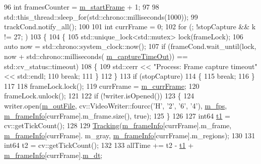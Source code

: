 \begin{DoxyCode}
96     \textcolor{keywordtype}{int} framesCounter = \mbox{\hyperlink{class_video_example_a98dbe94b8827c5a1898e3a9423cce402}{m\_startFrame}} + 1;
97 
98     std::this\_thread::sleep\_for(std::chrono::milliseconds(1000));
99     trackCond.notify\_all();
100 
101     \textcolor{keywordtype}{int} currFrame = 0;
102     \textcolor{keywordflow}{for} (; !stopCapture && k != 27; )
103     \{
104         \{
105             std::unique\_lock<std::mutex> lock(frameLock);
106             \textcolor{keyword}{auto} now = std::chrono::system\_clock::now();
107             \textcolor{keywordflow}{if} (frameCond.wait\_until(lock, now + std::chrono::milliseconds(
      \mbox{\hyperlink{class_video_example_aea3c9dd66a3464fab8c61a838aff0ccf}{m\_captureTimeOut}})) == std::cv\_status::timeout)
108             \{
109                 std::cerr << \textcolor{stringliteral}{"Process: Frame capture timeout"} << std::endl;
110                 \textcolor{keywordflow}{break};
111             \}
112         \}
113         \textcolor{keywordflow}{if} (stopCapture)
114         \{
115             \textcolor{keywordflow}{break};
116         \}
117 
118         frameLock.lock();
119         currFrame = \mbox{\hyperlink{class_video_example_a4adccbe4084f68f10d966901b168a98a}{m\_currFrame}};
120         frameLock.unlock();
121 
122         \textcolor{keywordflow}{if} (!writer.isOpened())
123         \{
124             writer.open(\mbox{\hyperlink{class_video_example_a4234fb0df2f009bc3f651f01cbd5bde5}{m\_outFile}}, cv::VideoWriter::fourcc(\textcolor{charliteral}{'H'}, \textcolor{charliteral}{'2'}, \textcolor{charliteral}{'6'}, \textcolor{charliteral}{'4'}), 
      \mbox{\hyperlink{class_video_example_ae8110012f8d57f39d6355377cf20fb27}{m\_fps}}, \mbox{\hyperlink{class_video_example_af5363ad3ed9a34bd105dbdaf274acb66}{m\_frameInfo}}[currFrame].m\_frame.size(), \textcolor{keyword}{true});
125         \}
126 
127         int64 \mbox{\hyperlink{gml2nestedsql_8cpp_a214bd1a0500f5739ce581a8bcffb518a}{t1}} = cv::getTickCount();
128 
129         \mbox{\hyperlink{class_video_example_af412482dcaad532d958dc31b362ee1c2}{Tracking}}(\mbox{\hyperlink{class_video_example_af5363ad3ed9a34bd105dbdaf274acb66}{m\_frameInfo}}[currFrame].m\_frame, \mbox{\hyperlink{class_video_example_af5363ad3ed9a34bd105dbdaf274acb66}{m\_frameInfo}}[currFrame].
      m\_gray, \mbox{\hyperlink{class_video_example_af5363ad3ed9a34bd105dbdaf274acb66}{m\_frameInfo}}[currFrame].m\_regions);
130 
131         int64 t2 = cv::getTickCount();
132 
133         allTime += t2 - \mbox{\hyperlink{gml2nestedsql_8cpp_a214bd1a0500f5739ce581a8bcffb518a}{t1}} + \mbox{\hyperlink{class_video_example_af5363ad3ed9a34bd105dbdaf274acb66}{m\_frameInfo}}[currFrame].\mbox{\hyperlink{struct_video_example_1_1_frame_info_a1f0a32e6ab3a40b1173f73767523372f}{m\_dt}};

\end{DoxyCode}
